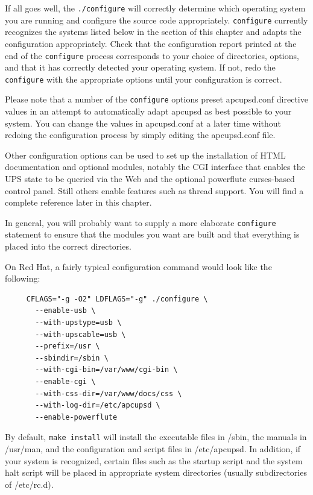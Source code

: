 If all goes well, the {\tt ./configure} will correctly determine which
operating system you are running and configure the source code appropriately.
{\tt configure} currently recognizes the systems listed below in the 
section of this chapter and adapts the configuration appropriately.  Check
that the configuration report printed at the end of the {\tt configure}
process corresponds to your choice of directories, options, and that it has
correctly detected your operating system.  If not, redo the {\tt configure}
with the appropriate options until your configuration is correct.  

Please note that a number of the {\tt configure} options preset apcupsd.conf
directive values in an attempt to automatically adapt apcupsd as best possible
to your system.  You can change the values in apcupsd.conf at a later time
without redoing the configuration process by simply editing the apcupsd.conf
file.  

Other configuration options can be used to set up the installation of HTML
documentation and optional modules, notably the CGI interface that enables the
UPS state to be queried via the Web and the optional powerflute curses-based
control panel.  Still others enable features such as thread support.  You will
find a complete reference later in this chapter.  

In general, you will probably want to supply a more elaborate {\tt configure}
statement to ensure that the modules you want are built and that everything is
placed into the correct directories.  

On Red Hat, a fairly typical configuration command would look like the
following: 

\footnotesize
\begin{verbatim}
     CFLAGS="-g -O2" LDFLAGS="-g" ./configure \
       --enable-usb \
       --with-upstype=usb \
       --with-upscable=usb \
       --prefix=/usr \
       --sbindir=/sbin \
       --with-cgi-bin=/var/www/cgi-bin \
       --enable-cgi \
       --with-css-dir=/var/www/docs/css \
       --with-log-dir=/etc/apcupsd \
       --enable-powerflute
\end{verbatim}
\normalsize

By default, {\tt make install} will install the executable files in /sbin, the
manuals in /usr/man, and the configuration and script files in /etc/apcupsd.
In addition, if your system is recognized, certain files such as the startup
script and the system halt script will be placed in appropriate system
directories (usually subdirectories of /etc/rc.d). 

